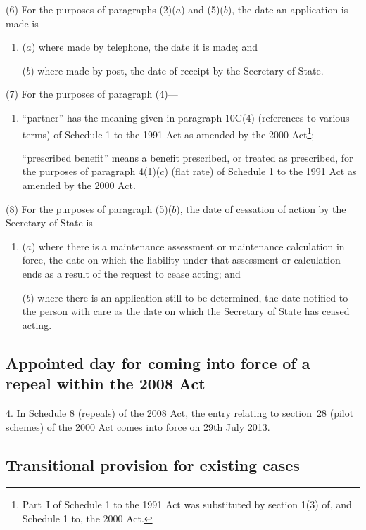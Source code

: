\documentclass[12pt,a4paper]{article}
\begin{document}
(6) For the purposes of paragraphs (2)($a$)  and (5)($b$), the date an application is made is—
\begin{enumerate}\item[]
($a$) where made by telephone, the date it is made; and

($b$) where made by post, the date of receipt by the Secretary of State.
\end{enumerate}

(7) For the purposes of paragraph (4)—
\begin{enumerate}\item[]
“partner” has the meaning given in paragraph 10C(4) (references to various terms) of Schedule 1 to the 1991 Act as amended by the 2000 Act\footnote{Part~I of Schedule 1 to the 1991 Act was substituted by section 1(3) of, and Schedule 1 to, the 2000 Act.};

“prescribed benefit” means a benefit prescribed, or treated as prescribed, for the purposes of paragraph 4(1)($c$)  (flat rate) of Schedule 1 to the 1991 Act as amended by the 2000 Act.
\end{enumerate}

(8) For the purposes of paragraph (5)($b$), the date of cessation of action by the Secretary of State is—
\begin{enumerate}\item[]
($a$) where there is a maintenance assessment or maintenance calculation in force, the date on which the liability under that assessment or calculation ends as a result of the request to cease acting; and

($b$) where there is an application still to be determined, the date notified to the person with care as the date on which the Secretary of State has ceased acting.
\end{enumerate}

\subsection[4. Appointed day for coming into force of a repeal within the 2008 Act]{Appointed day for coming into force of a repeal within the 2008 Act}

4.  In Schedule 8 (repeals) of the 2008 Act, the entry relating to section~28 (pilot schemes) of the 2000 Act comes into force on 29th July 2013.

\subsection[5. Transitional provision for existing cases]{Transitional provision for existing cases}
\end{document}
